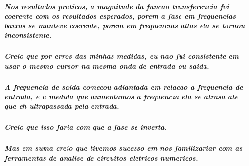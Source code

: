 \documentclass[12pt,twoside, a4paper, twocolumn]{article}
\begin{document}
\subparagraph*{Nos resultados praticos, a magnitude da funcao transferencia foi coerente com os resultados esperados, porem a fase em frequencias baixas se manteve coerente, porem em frequencias altas ela se tornou inconsistente.}

\subparagraph*{Creio que por erros das minhas medidas, eu nao fui consistente em usar o mesmo cursor na mesma onda de entrada ou saida.}

\subparagraph*{A frequencia de saida comecou adiantada em relacao a frequencia de entrada, e a medida que aumentamos a frequencia ela se atrasa ate que eh ultrapassada pela entrada.}

\subparagraph*{Creio que isso faria com que a fase se inverta.}

\subparagraph*{Mas em suma creio que tivemos sucesso em nos familizariar com as ferramentas de analise de circuitos eletricos numericos.}
\end{document}
